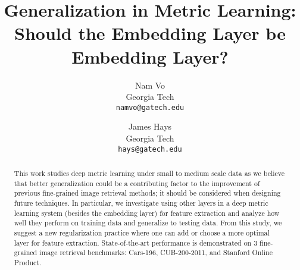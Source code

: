 \documentclass[10pt,twocolumn,letterpaper]{article}
\begin{document}
\title{Generalization in Metric Learning: \\ Should the Embedding Layer be Embedding Layer?}

\author{Nam Vo \\
Georgia Tech \\
{\tt\small namvo@gatech.edu}
\and
James Hays \\
Georgia Tech \\
{\tt\small hays@gatech.edu}
}

\maketitle
\ifwacvfinal\thispagestyle{empty}\fi

\begin{abstract}


This work studies deep metric learning under small to medium scale data as we believe that better generalization could be a contributing factor to the improvement of previous fine-grained image retrieval methods; it should be considered when designing future techniques. In particular, we investigate using other layers in a deep metric learning system (besides the embedding layer) for feature extraction and analyze how well they perform on training data and generalize to testing data. 
From this study, we suggest a new regularization practice where one can add or choose a more optimal layer for feature extraction. State-of-the-art performance is demonstrated on 3 fine-grained image retrieval benchmarks: Cars-196, CUB-200-2011, and Stanford Online Product.

\end{abstract}

\end{document}
